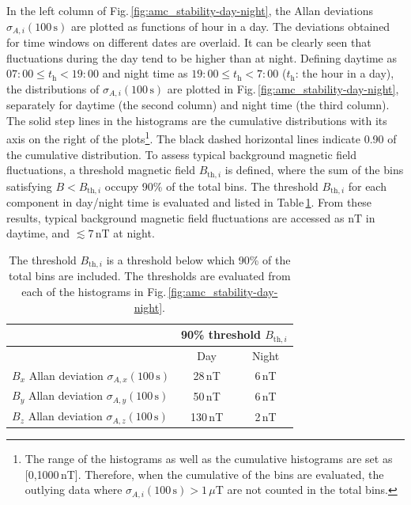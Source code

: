 In the left column of  Fig.\,\ref{fig:amc_stability-day-night}, the Allan deviations $\sigma_{A,i} (100\,\mathrm{s})$ are plotted as functions of hour in a day. The deviations obtained for time windows on different dates are overlaid. It can be clearly seen that fluctuations during the day tend to be higher than at night. Defining daytime as 
$07:00\leq t_{\mathrm{h}}<19:00$ and night time as $19:00\leq t_{\mathrm{h}}<7:00$ ($t_{\mathrm{h}}$: the hour in a day), the distributions of $\sigma_{A,i} (100\,\mathrm{s})$ are plotted in Fig.\,\ref{fig:amc_stability-day-night}, separately for daytime (the second column) and night time (the third column).  The  solid step lines in the histograms are the cumulative distributions with its axis on the right of the plots\footnote{The range of the histograms as well as the cumulative histograms are set as [0,1000\,nT]. Therefore, when the cumulative of the bins are evaluated, the outlying data where $\sigma_{A,i}(100\,\mathrm{s})>1\,\mu$T are not counted in the total bins.}. The black dashed horizontal lines indicate 0.90 of the cumulative distribution. To assess typical background magnetic field fluctuations,  a threshold magnetic field $B_{\mathrm{th},i}$  is defined, where the sum of the bins satisfying $B<B_{\mathrm{th},i}$ occupy  90\% of the total bins.  The threshold $B_{\mathrm{th},i}$ for each component in day/night time is evaluated and listed in  
Table\,\ref{tab:amc_stability}. From these results, typical background magnetic field  fluctuations are accessed as  $\mathrm{nT}$ in daytime, and $\lesssim 7\,\mathrm{nT}$ at night.

\begin{table}[tb!]
\centering 
\begin{tabular}{|l||c|c|}
\hline
 &\multicolumn{2}{c|}{90\% threshold $B_{\mathrm{th},i}$ }  \\ \hline
 &Day & Night \\ \hline\hline 
$B_{x}$ Allan deviation $\sigma_{A,x}(100\,\mathrm{s})$  & 28\,nT &    6\,nT     \\ \hline
$B_{y}$ Allan deviation $\sigma_{A,y}(100\,\mathrm{s})$ & 50\,nT  & 6\,nT      \\ \hline
$B_{z}$ Allan deviation $\sigma_{A,z}(100\,\mathrm{s})$ &130\,nT  & 2\,nT      \\ \hline
\end{tabular}
\caption{The threshold $B_{\mathrm{th},i}$ is a threshold below which 90\% of the total bins are included. 
The thresholds are evaluated from each of the histograms in Fig.\,\ref{fig:amc_stability-day-night}.}
\label{tab:amc_stability}
\end{table}


